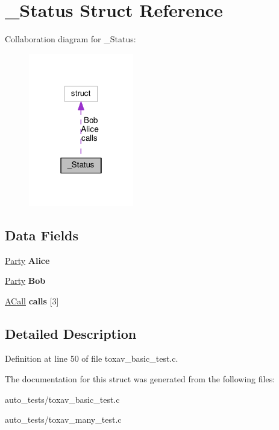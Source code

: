 \hypertarget{struct___status}{\section{\+\_\+\+Status Struct Reference}
\label{struct___status}
}


Collaboration diagram for \+\_\+\+Status\+:\nopagebreak
\begin{figure}[H]
\begin{center}
\leavevmode
\includegraphics[width=130pt]{struct___status__coll__graph}
\end{center}
\end{figure}
\subsection*{Data Fields}
\begin{DoxyCompactItemize}
\item 
\hypertarget{struct___status_a0fd20957e107227630b542b146c276d4}{\hyperlink{struct___party}{Party} {\bfseries Alice}}\label{struct___status_a0fd20957e107227630b542b146c276d4}

\item 
\hypertarget{struct___status_a78cf423939bd332fd6e5ddae67134e01}{\hyperlink{struct___party}{Party} {\bfseries Bob}}\label{struct___status_a78cf423939bd332fd6e5ddae67134e01}

\item 
\hypertarget{struct___status_a2f6221bbb611e0d485e26cd2722bd7ee}{\hyperlink{struct___a_call}{A\+Call} {\bfseries calls} \mbox{[}3\mbox{]}}\label{struct___status_a2f6221bbb611e0d485e26cd2722bd7ee}

\end{DoxyCompactItemize}


\subsection{Detailed Description}


Definition at line 50 of file toxav\+\_\+basic\+\_\+test.\+c.



The documentation for this struct was generated from the following files\+:\begin{DoxyCompactItemize}
\item 
auto\+\_\+tests/toxav\+\_\+basic\+\_\+test.\+c\item 
auto\+\_\+tests/toxav\+\_\+many\+\_\+test.\+c\end{DoxyCompactItemize}
